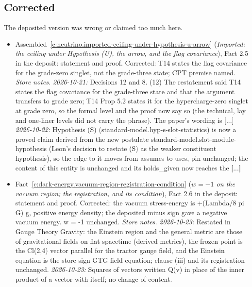 \documentclass[11pt]{article}
\theoremstyle{definition}
\theoremstyle{plain}
\begin{document}
\subsection*{Corrected}
The deposited version was wrong or claimed too much here.
\begin{itemize}\setlength{\itemsep}{2pt}
\item Assembled~\ref{c:neutrino.imported-ceiling-under-hypothesis-u-arrow} (\emph{Imported: the ceiling under Hypothesis (U), the arrow, and the flag covariance}), Fact 2.5 in the deposit: statement and proof. Corrected: T14 states the flag covariance for the grade-zero singlet, not the grade-three state; CPT premise named. \emph{Store notes.} \emph{2026-10-21:} Decisions 12 and 8. (12) The restatement said T14 states the flag covariance for the grade-three state and that the argument transfers to grade zero; T14 Prop 5.2 states it for the hypercharge-zero singlet at grade zero, so the formal level and the proof now say so (the technical, lay and one-liner levels did not carry the phrase). The paper's wording is [...] \emph{2026-10-22:} Hypothesis (S) (standard-model.hyp-s-slot-statistics) is now a proved claim derived from the new postulate standard-model.slot-module-hypothesis (Leon's decision to restate (S) as the weaker constituent hypothesis), so the edge to it moves from assumes to uses, pin unchanged; the content of this entity is unchanged and its holds\_given now reaches the [...]
\item Fact~\ref{c:dark-energy.vacuum-region-registration-condition} (\emph{$w = -1$ on the vacuum region; the registration, and its condition}), Fact 2.6 in the deposit: statement and proof. Corrected: the vacuum stress-energy is +(Lambda/8 pi G) g, positive energy density; the deposited minus sign gave a negative vacuum energy. w = -1 unchanged. \emph{Store notes.} \emph{2026-10-23:} Restated in Gauge Theory Gravity: the Einstein region and the general metric are those of gravitational fields on flat spacetime (derived metrics), the frozen point is the Cl(2,4) vector parallel for the tractor gauge field, and the Einstein equation is the store-sign GTG field equation; clause (iii) and its registration unchanged. \emph{2026-10-23:} Squares of vectors written Q(v) in place of the inner product of a vector with itself; no change of content.
\end{itemize}
\end{document}
